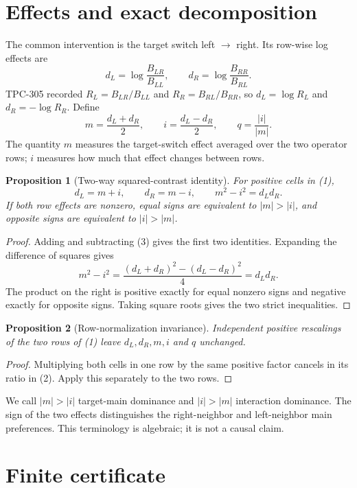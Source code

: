 \documentclass[11pt]{article}
\newtheorem{proposition}{Proposition}
\begin{document}
\section{Effects and exact decomposition}

The common intervention is the target switch left $\to$ right.  Its row-wise
log effects are
\[
 d_L=\log\frac{B_{LR}}{B_{LL}},\qquad
 d_R=\log\frac{B_{RR}}{B_{RL}}.                                  \tag{2}
\]
TPC-305 recorded $R_L=B_{LR}/B_{LL}$ and
$R_R=B_{RL}/B_{RR}$, so $d_L=\log R_L$ and $d_R=-\log R_R$.  Define
\[
 m=\frac{d_L+d_R}{2},\qquad
 i=\frac{d_L-d_R}{2},\qquad
 q=\frac{|i|}{|m|}.                                               \tag{3}
\]
The quantity $m$ measures the target-switch effect averaged over the two
operator rows; $i$ measures how much that effect changes between rows.

\begin{proposition}[Two-way squared-contrast identity]
For positive cells in (1),
\[
 d_L=m+i,\qquad d_R=m-i,\qquad m^2-i^2=d_Ld_R.                   \tag{4}
\]
If both row effects are nonzero, equal signs are equivalent to $|m|>|i|$,
and opposite signs are equivalent to $|i|>|m|$.
\end{proposition}
\begin{proof}
Adding and subtracting (3) gives the first two identities.  Expanding the
difference of squares gives
\[
 m^2-i^2=\frac{(d_L+d_R)^2-(d_L-d_R)^2}{4}=d_Ld_R.
\]
The product on the right is positive exactly for equal nonzero signs and
negative exactly for opposite signs.  Taking square roots gives the two strict
inequalities.
\end{proof}

\begin{proposition}[Row-normalization invariance]
Independent positive rescalings of the two rows of (1) leave $d_L,d_R,m,i$
and $q$ unchanged.
\end{proposition}
\begin{proof}
Multiplying both cells in one row by the same positive factor cancels in its
ratio in (2).  Apply this separately to the two rows.
\end{proof}

We call $|m|>|i|$ target-main dominance and $|i|>|m|$ interaction dominance.
The sign of the two effects distinguishes the right-neighbor and left-neighbor
main preferences.  This terminology is algebraic; it is not a causal claim.

\section{Finite certificate}
\end{document}
